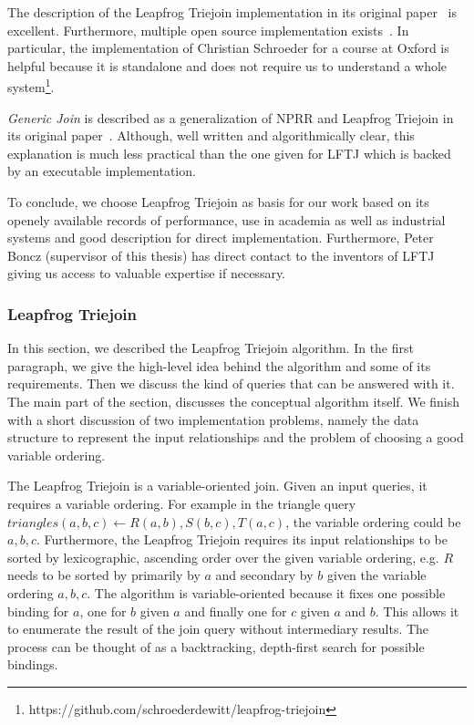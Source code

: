 The description of the Leapfrog Triejoin implementation in its original paper~\cite{lftj} is excellent.
Furthermore, multiple open source implementation exists~\cite{leapfrog-triejoin-schroeder,myria-detailed}.
In particular, the implementation of Christian Schroeder for a course at Oxford is helpful because it is standalone and
does not require us to understand a whole system\footnote{https://github.com/schroederdewitt/leapfrog-triejoin}.

\textit{Generic Join} is described as a generalization of \textsc{NPRR} and Leapfrog Triejoin in its original
paper~\cite{skew-strikes-back}.
Although, well written and algorithmically clear, this explanation is much less practical than the one given for \textsc{LFTJ} which
is backed by an executable implementation.

To conclude, we choose Leapfrog Triejoin as basis for our work based on its openely available records of performance, use in
academia as well as industrial systems and good description for direct implementation.
Furthermore, Peter Boncz (supervisor of this thesis) has direct contact to the inventors of \textsc{LFTJ} giving us access to valuable
expertise if necessary.

\subsubsection{Leapfrog Triejoin} \label{subsubsec:leapfrog-triejoin}
In this section, we described the Leapfrog Triejoin algorithm.
In the first paragraph, we give the high-level idea behind the algorithm and some of its requirements.
Then we discuss the kind of queries that can be answered with it.
The main part of the section, discusses the conceptual algorithm itself.
We finish with a short discussion of two implementation problems, namely the data structure to represent the input relationships and
the problem of choosing a good variable ordering.

The Leapfrog Triejoin is a variable-oriented join.
Given an input queries, it requires a variable ordering.
For example in the triangle query $triangles(a, b, c) \leftarrow R(a, b), S(b, c), T(a, c)$,
the variable ordering could be $a, b, c$.
Furthermore, the Leapfrog Triejoin requires its input relationships to be sorted by lexicographic, ascending order over the given
variable ordering, e.g. $R$ needs to be sorted by primarily by $a$ and secondary by $b$ given the variable ordering $a, b, c$.
The algorithm is variable-oriented because it fixes one possible binding for $a$, one for $b$ given $a$ and finally one for $c$ given $a$
and $b$.
This allows it to enumerate the result of the join query without intermediary results.
The process can be thought of as a backtracking, depth-first search for possible bindings.

